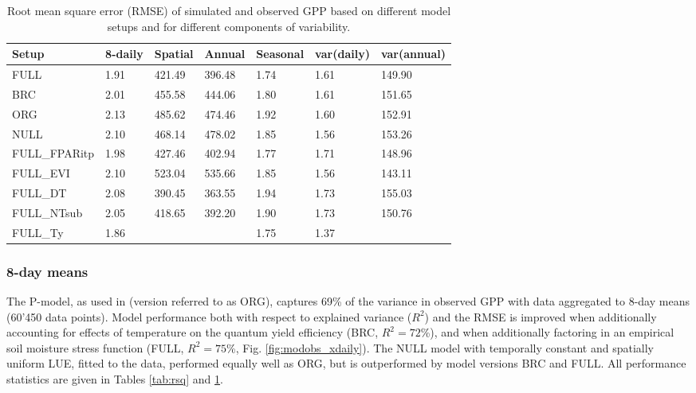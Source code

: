 \documentclass{myreport}
\begin{document}
\begin{table}
\centering
\begin{tabular}{lllllll}
  \toprule
  Setup & 8-daily & Spatial & Annual & Seasonal & var(daily) & var(annual) \\ 
  \midrule
  FULL & 1.91 & 421.49 & 396.48 & 1.74 & 1.61 & 149.90 \\ 
  BRC & 2.01 & 455.58 & 444.06 & 1.80 & 1.61 & 151.65 \\ 
  ORG & 2.13 & 485.62 & 474.46 & 1.92 & 1.60 & 152.91 \\ 
  NULL & 2.10 & 468.14 & 478.02 & 1.85 & 1.56 & 153.26 \\ 
  \midrule
  FULL\_FPARitp & 1.98 & 427.46 & 402.94 & 1.77 & 1.71 & 148.96 \\ 
  FULL\_EVI & 2.10 & 523.04 & 535.66 & 1.85 & 1.56 & 143.11 \\ 
  \midrule
  FULL\_DT & 2.08 & 390.45 & 363.55 & 1.94 & 1.73 & 155.03 \\ 
  FULL\_NTsub & 2.05 & 418.65 & 392.20 & 1.90 & 1.73 & 150.76 \\ 
  FULL\_Ty & 1.86 &  &  & 1.75 & 1.37 & \\ 
  \bottomrule
  \end{tabular}
\caption{Root mean square error (RMSE) of simulated and observed GPP based on different model setups and for different components of variability.} 
\label{tab:rmse}
\end{table}

\subsubsection{8-day means}

The P-model, as used in \cite{wang17natpl} (version referred to as ORG), captures 69\% of the variance in observed GPP with data aggregated to 8-day means (60’450 data points). Model performance both with respect to explained variance ($R^2$) and the RMSE is improved when additionally accounting for effects of temperature on the quantum yield efficiency (BRC, $R^2 = 72$\%), and when additionally factoring in an empirical soil moisture stress function (FULL, $R^2 = 75$\%, Fig. \ref{fig:modobs_xdaily}). The NULL model with temporally constant and spatially uniform LUE, fitted to the data, performed equally well as ORG, but is outperformed by model versions BRC and FULL. All performance statistics are given in Tables \ref{tab:rsq} and \ref{tab:rmse}. %
\end{document}
